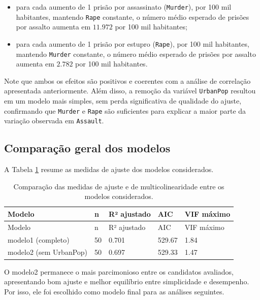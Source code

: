 \documentclass[a4paper]{modeloUFCG} %
\begin{document}
\begin{itemize}
\item
  para cada aumento de 1 prisão por assassinato (\texttt{Murder}), por 100 mil habitantes, mantendo \texttt{Rape} constante, o número médio esperado
  de prisões por assalto aumenta em \(11.972\) por 100 mil habitantes;
\item
  para cada aumento de 1 prisão por estupro (\texttt{Rape}), por 100 mil habitantes, mantendo \texttt{Murder} constante, o número médio esperado
  de prisões por assalto aumenta em \(2.782\) por 100 mil habitantes.
\end{itemize}

Note que ambos os efeitos são positivos e coerentes com a análise de correlação apresentada anteriormente. Além disso, a remoção da
variável \texttt{UrbanPop} resultou em um modelo mais simples, sem perda significativa de qualidade do ajuste, confirmando que \texttt{Murder} e
\texttt{Rape} são suficientes para explicar a maior parte da variação observada em \texttt{Assault}.

\subsection{Comparação geral dos modelos}\label{comparauxe7uxe3o-geral-dos-modelos}

A Tabela \ref{tab:comparaModelos} resume as medidas de ajuste dos modelos considerados.

\begin{longtable}[]{@{}lllll@{}}
\caption{\label{tab:comparaModelosGeral}\label{tab:comparaModelos} Comparação das medidas de ajuste e de multicolinearidade entre os modelos considerados.}\tabularnewline
\toprule\noalign{}
Modelo & n & R² ajustado & AIC & VIF máximo \\
\midrule\noalign{}
\endfirsthead
\toprule\noalign{}
Modelo & n & R² ajustado & AIC & VIF máximo \\
\midrule\noalign{}
\endhead
\bottomrule\noalign{}
\endlastfoot
modelo1 (completo) & 50 & 0.701 & 529.67 & 1.84 \\
modelo2 (sem UrbanPop) & 50 & 0.697 & 529.33 & 1.47 \\
\end{longtable}

O modelo2 permanece o mais parcimonioso entre os candidatos avaliados, apresentando bom ajuste e melhor equilíbrio entre simplicidade e desempenho. Por isso, ele foi escolhido como modelo final para as análises seguintes.
\end{document}
